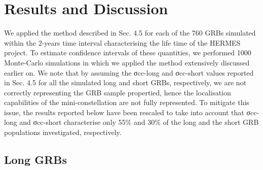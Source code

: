 \documentclass[]{spie}  %
\begin{document}
\section{Results and Discussion}

We applied the method described in Sec. 4.5 for each of the 760 GRBs simulated within the 2-years time interval characterising the life time of the HERMES project. To estimate confidence intervals of these quantities, we performed 1000 Monte-Carlo simulations in which we applied the method extensively discussed earlier on. We note that by assuming the σcc-long and σcc-short values reported in Sec. 4.5 for all the simulated long and short GRBs, respectively, we are not correctly representing the GRB sample propertied, hence the localisation capabilities of the mini-constellation are not fully represented. To mitigate this issue, the results reported below have been rescaled to take into account that σcc-long and σcc-short characterise only 55\% and 30\% of the long and the short GRB populations investigated, respectively.



\subsection{Long GRBs}
\end{document}
